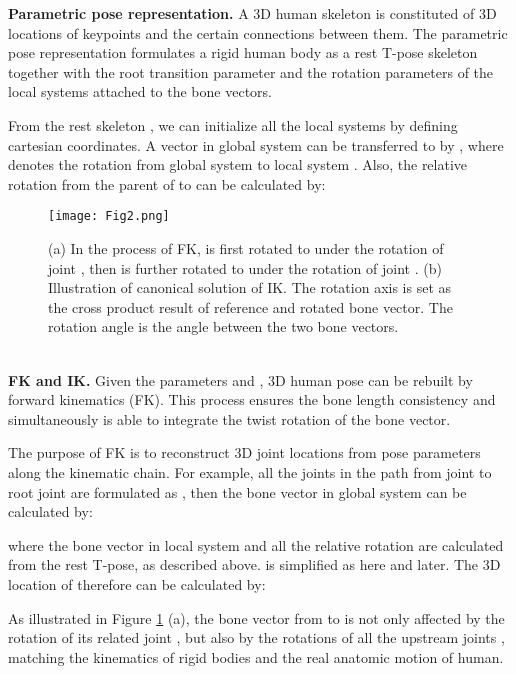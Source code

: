 \documentclass[lettersize,journal]{IEEEtran}
\begin{document}
\noindent \textbf{Parametric pose representation.}
\quad A 3D human skeleton is constituted of 3D locations of  keypoints  and the certain connections between them. The parametric pose representation formulates a rigid human body as a rest T-pose skeleton  together with the root transition parameter  and the rotation parameters  of the local systems  attached to the bone vectors. 

From the rest skeleton , we can initialize all the local systems  by defining cartesian coordinates. A vector  in global system can be transferred to  by , where  denotes the rotation from global system  to local system . Also, the relative rotation from the parent  of  to  can be calculated by:


\begin{figure}[t]
 \begin{center}
 	\centerline{\texttt{[image: Fig2.png]}}
\caption{(a) In the process of FK,  is first rotated to  under the rotation  of joint , then is further rotated to  under the rotation  of joint . (b) Illustration of canonical solution of IK. The rotation axis is set as the cross product result of reference and rotated bone vector. The rotation angle is the angle between the two bone vectors.}
\label{fig2}
\end{center}
\end{figure}

~\\
\noindent \textbf{FK and IK.}
\quad Given the parameters  and  , 3D human pose can be rebuilt by forward kinematics (FK). This process ensures the bone length consistency and simultaneously is able to integrate the twist rotation of the bone vector.

The purpose of FK is to reconstruct 3D joint locations from pose parameters along the kinematic chain. For example, all the joints in the path from joint  to root joint are formulated as , then the bone vector in global system  can be calculated by:

where the bone vector in local system  and all the relative rotation are calculated from the rest T-pose, as described above.  is simplified as  here and later. The 3D location of  therefore can be calculated by:

As illustrated in Figure \ref{fig2} (a),  the bone vector  from  to  is not only affected by the rotation  of its related joint , but also by the rotations of all the upstream joints , matching the kinematics of rigid bodies and the real anatomic motion of human. 
\end{document}

